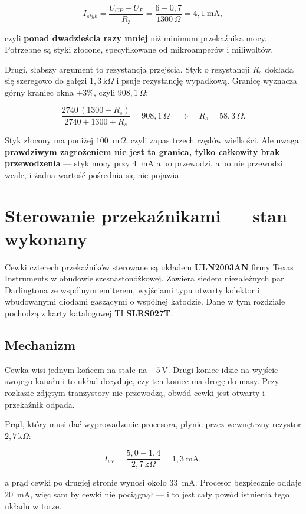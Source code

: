 \documentclass[a4paper,11pt]{article}
\newcommand{\ohm}{\,\Omega}
\newcommand{\kohm}{\,\mathrm{k}\Omega}
\newcommand{\volt}{\,\mathrm{V}}
\begin{document}
\[
I_{styk}=\frac{U_{CP}-U_{F}}{R_3}=\frac{6-0{,}7}{1300\ohm}=4{,}1\ \mathrm{mA},
\]

czyli \textbf{ponad dwadzieścia razy mniej} niż minimum przekaźnika mocy. Potrzebne
są styki złocone, specyfikowane od mikroamperów i miliwoltów.

Drugi, słabszy argument to rezystancja przejścia. Styk o rezystancji $R_s$ dokłada
się szeregowo do gałęzi $1{,}3\kohm$ i psuje rezystancję wypadkową. Granicę
wyznacza górny kraniec okna $\pm3\%$, czyli $908{,}1\ohm$:

\[
\frac{2740\,(1300+R_s)}{2740+1300+R_s}=908{,}1\ohm
\quad\Longrightarrow\quad
R_s = 58{,}3\ohm .
\]

Styk złocony ma poniżej $100$~m$\Omega$, czyli zapas trzech rzędów wielkości. Ale
uwaga: \textbf{prawdziwym zagrożeniem nie jest ta granica, tylko całkowity brak
przewodzenia} --- styk mocy przy $4$~mA albo przewodzi, albo nie przewodzi wcale,
i żadna wartość pośrednia się nie pojawia.

\section{Sterowanie przekaźnikami --- stan wykonany}
\label{sec:sterownik}

Cewki czterech przekaźników sterowane są układem \textbf{ULN2003AN} firmy Texas
Instruments w obudowie szesnastonóżkowej. Zawiera siedem niezależnych par
Darlingtona ze wspólnym emiterem, wyjściami typu otwarty kolektor i wbudowanymi
diodami gaszącymi o wspólnej katodzie. Dane w tym rozdziale pochodzą z karty
katalogowej TI \textbf{SLRS027T}.

\subsection{Mechanizm}

Cewka wisi jednym końcem na stałe na $+5\volt$. Drugi koniec idzie na wyjście
swojego kanału i to układ decyduje, czy ten koniec ma drogę do masy. Przy rozkazie
zdjętym tranzystory nie przewodzą, obwód cewki jest otwarty i przekaźnik odpada.

Prąd, który musi dać wyprowadzenie procesora, płynie przez wewnętrzny rezystor
$2{,}7\kohm$:

\[
I_{we}=\frac{5{,}0-1{,}4}{2{,}7\kohm}=1{,}3\ \mathrm{mA},
\]

a prąd cewki po drugiej stronie wynosi około $33$~mA. Procesor bezpiecznie oddaje
$20$~mA, więc sam by cewki nie pociągnął --- i to jest cały powód istnienia tego
układu w torze.
\end{document}
